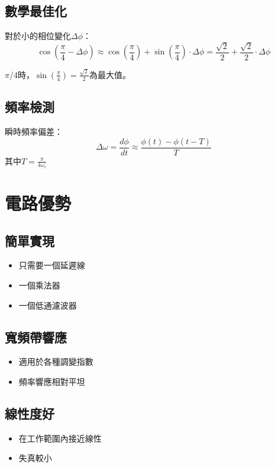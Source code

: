 \documentclass{article}
\begin{document}
\subsection{數學最佳化}
對於小的相位變化$\Delta\phi$：
\begin{equation}
\cos\left(\frac{\pi}{4} - \Delta\phi\right) \approx \cos\left(\frac{\pi}{4}\right) + \sin\left(\frac{\pi}{4}\right) \cdot \Delta\phi = \frac{\sqrt{2}}{2} + \frac{\sqrt{2}}{2} \cdot \Delta\phi
\end{equation}

$\pi$/4時，$\sin\left(\frac{\pi}{4}\right) = \frac{\sqrt{2}}{2}$為最大值。

\subsection{頻率檢測}
瞬時頻率偏差：
\begin{equation}
\Delta\omega = \frac{d\phi}{dt} \approx \frac{\phi(t) - \phi(t - T)}{T}
\end{equation}
其中$T = \frac{\pi}{4\omega_c}$

\section{電路優勢}

\subsection{簡單實現}
\begin{itemize}
    \item 只需要一個延遲線
    \item 一個乘法器
    \item 一個低通濾波器
\end{itemize}

\subsection{寬頻帶響應}
\begin{itemize}
    \item 適用於各種調變指數
    \item 頻率響應相對平坦
\end{itemize}

\subsection{線性度好}
\begin{itemize}
    \item 在工作範圍內接近線性
    \item 失真較小
\end{itemize}
\end{document}
